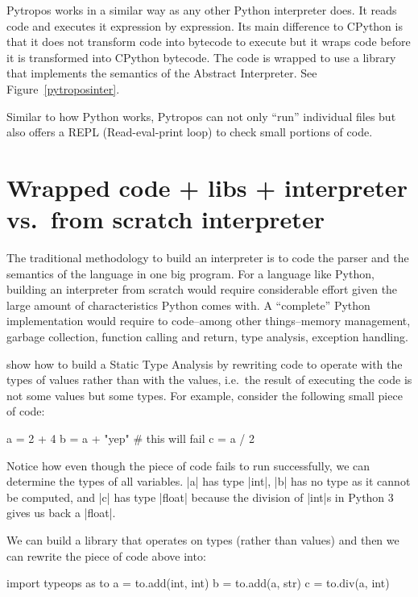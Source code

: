 Pytropos works in a similar way as any other Python interpreter does. It
reads code and executes it expression by expression. Its main difference
to CPython is that it does not transform code into bytecode to execute
but it wraps code before it is transformed into CPython bytecode. The
code is wrapped to use a library that implements the semantics of the
Abstract Interpreter. See Figure~\ref{pytroposinter}.

Similar to how Python works, Pytropos can not only \enquote{run}
individual files but also offers a REPL (Read-eval-print loop) to check
small portions of code.

\section{Wrapped code + libs + interpreter vs.~from scratch interpreter}%
\label{wrapped-code-libs-interpreter-vs.from-scratch-interpreter}

The traditional methodology to build an interpreter is to code the parser and the
semantics of the language in one big program. For a language like Python, building an
interpreter from scratch would require considerable effort given the large amount of
characteristics Python comes with. A \enquote{complete} Python implementation would
require to code--among other things--memory management, garbage collection, function calling and return, type
analysis, exception handling.

\textcite{ortin_towards_2015} show how to build a Static Type Analysis
by rewriting code to operate with the types of values rather than with
the values, i.e.~the result of executing the code is not some values but
some types. For example, consider the following small piece of code:

\begin{pythoncode}
a = 2 + 4
b = a + "yep"  # this will fail
c = a / 2
\end{pythoncode}

Notice how even though the piece of code fails to run successfully,
we can determine the types of all variables. \pycode|a| has type
\pycode|int|, \pycode|b| has no type as it cannot be
computed, and \pycode|c| has type \pycode|float| because the
division of \pycode|int|s in Python 3 gives us back a \pycode|float|.

We can build a library that operates on types (rather than values) and
then we can rewrite the piece of code above into:

\begin{pythoncode}
import typeops as to
a = to.add(int, int)
b = to.add(a, str)
c = to.div(a, int)
\end{pythoncode}

